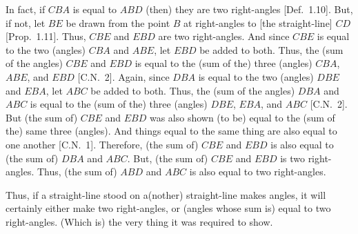 \begin{Parallel}{}{}
{\epsfysize=2in
\centerline{}

In fact, if $CBA$ is equal to $ABD$ (then) they are two right-angles [Def.~1.10].
But, if not, let $BE$ be drawn from the point $B$ at right-angles to [the
straight-line] $CD$ [Prop.~1.11]. Thus, $CBE$ and $EBD$ are two right-angles.
And since $CBE$ is equal to the two (angles) $CBA$ and $ABE$, let $EBD$ be added
to both. Thus, the (sum of the angles) $CBE$ and $EBD$ is equal to the  (sum of the) three (angles)
$CBA$, $ABE$, and $EBD$ [C.N.~2]. Again, since $DBA$ is equal to the two (angles) $DBE$
and $EBA$, let $ABC$ be added to both. Thus, the (sum of the angles) $DBA$ and $ABC$ is
equal to the (sum of the) three (angles) $DBE$, $EBA$, and $ABC$ [C.N.~2]. But (the sum of) $CBE$ and $EBD$ was
also shown (to be) equal to the (sum of the) same three (angles). And things equal to the
same thing are also equal to one another [C.N.~1]. Therefore, 
(the sum of) $CBE$ and
$EBD$ is also equal to (the sum of) $DBA$ and $ABC$. But, (the sum of) $CBE$ and $EBD$ is two
right-angles. Thus, (the sum of) $ABD$ and $ABC$ is also equal to two right-angles.

Thus, if a straight-line stood on a(nother)  straight-line makes angles,
it will certainly either make two right-angles, or (angles whose sum is) equal
to two right-angles. (Which is) the very thing it was required to show.}
\end{Parallel}

